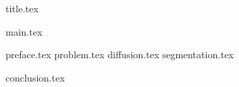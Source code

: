 

\usepackage{xassoccnt}
\usepackage{lastpage}

\usepackage{totcount}
\def\oldcite{}
\let\oldcite=\bibcite
\def\bibcite{\stepcounter{citenum}\oldcite}



{title.tex}

\clearpage
{}
{main.tex}

\tableofcontents

\clearpage
{}
\pagestyle{fancy}
\setcounter{page}{8}

\clearpage

{preface.tex}
{problem.tex}
{diffusion.tex}
{segmentation.tex}

{conclusion.tex}

\clearpage
{}
{}
\renewcommand\bibname{Перелік посилань}




